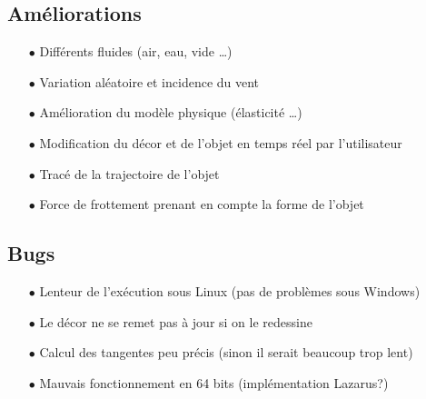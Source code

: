 \subsection{Améliorations}
\begin{itemize}
\item[$\bullet$] Différents fluides (air, eau, vide \dots)
\item[$\bullet$] Variation aléatoire et incidence du vent 
\item[$\bullet$] Amélioration du modèle physique (élasticité \dots )
\item[$\bullet$] Modification du décor et de l'objet en temps réel par l'utilisateur
\item[$\bullet$] Tracé de la trajectoire de l'objet
\item[$\bullet$] Force de frottement prenant en compte la forme de l'objet
\end{itemize}
\subsection{Bugs}
\begin{itemize}
\item[$\bullet$] Lenteur de l'exécution sous Linux (pas de problèmes sous Windows)
\item[$\bullet$] Le décor ne se remet pas à jour si on le redessine
\item[$\bullet$] Calcul des tangentes peu précis (sinon il serait beaucoup trop lent)
\item[$\bullet$] Mauvais fonctionnement en 64 bits (implémentation Lazarus?)
\end{itemize}
